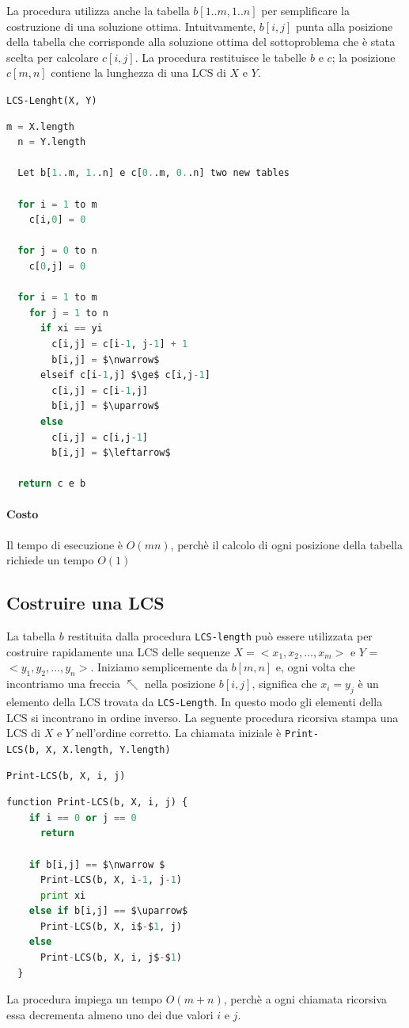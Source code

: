 La procedura utilizza anche la tabella $b[1..m, 1..n]$ per
semplificare la costruzione di una soluzione ottima. Intuitvamente,
$b[i, j]$ punta alla posizione della tabella che corrisponde alla
soluzione ottima del sottoproblema che è stata scelta per calcolare
$c[i,j]$. La procedura restituisce le tabelle $b$ e $c$; la
posizione $c[m,n]$ contiene la lunghezza di una LCS di $X$ e $Y$.

\texttt{LCS-Lenght(X, Y)}

\begin{lstlisting}[language=Python, mathescape=true]
  m = X.length
  n = Y.length

  Let b[1..m, 1..n] e c[0..m, 0..n] two new tables

  for i = 1 to m
    c[i,0] = 0

  for j = 0 to n
    c[0,j] = 0

  for i = 1 to m
    for j = 1 to n
      if xi == yi
        c[i,j] = c[i-1, j-1] + 1
        b[i,j] = $\nwarrow$
      elseif c[i-1,j] $\ge$ c[i,j-1]
        c[i,j] = c[i-1,j]
        b[i,j] = $\uparrow$
      else 
        c[i,j] = c[i,j-1] 
        b[i,j] = $\leftarrow$

  return c e b
\end{lstlisting}

\paragraph{Costo}

Il tempo di esecuzione è $O(mn)$, perchè il calcolo di ogni posizione
della tabella richiede un tempo $O(1)$

\subsection{Costruire una LCS}

La tabella $b$ restituita dalla procedura \texttt{LCS-length} può
essere utilizzata per costruire rapidamente una LCS delle sequenze
$X = <x_1, x_2, ..., x_m>$ e $Y$ = $<y_1, y_2, ..., y_n>$.
Iniziamo semplicemente da $b[m,n]$ e, ogni volta che incontriamo una
freccia $\nwarrow $ nella posizione $b[i,j]$, significa che $x_i = y_j$ è
un elemento della LCS trovata da \texttt{LCS-Length}. In questo modo gli
elementi della LCS si incontrano in ordine inverso. La seguente
procedura ricorsiva stampa una LCS di $X$ e $Y$ nell'ordine
corretto. La chiamata iniziale è
\texttt{Print-LCS(b,\ X,\ X.length,\ Y.length)}

\texttt{Print-LCS(b, X, i, j)}
\begin{lstlisting}[language=Python, mathescape=true]
  function Print-LCS(b, X, i, j) {
    if i == 0 or j == 0
      return
  
    if b[i,j] == $\nwarrow $
      Print-LCS(b, X, i-1, j-1)
      print xi
    else if b[i,j] == $\uparrow$
      Print-LCS(b, X, i$-$1, j)
    else
      Print-LCS(b, X, i, j$-$1)
  }
\end{lstlisting}

La procedura impiega un tempo $O(m + n)$, perchè a ogni chiamata
ricorsiva essa decrementa almeno uno dei due valori $i$ e $j$.
